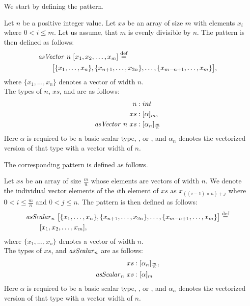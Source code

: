 We start by defining the \asVector pattern.
\begin{definition}
  \label{definition:pattern:asVector}
  Let $n$ be a positive integer value.
  Let $xs$ be an array of size $m$ with elements $x_i$ where $0 < i \leq m$.
  Let us assume, that $m$ is evenly divisible by $n$.
  The \asVector pattern is then defined as follows:
  \begin{align*}
    &\text{\textit{asVector}}\ n\ [x_1, x_2, \dots, x_m] \stackrel{\textrm{\scriptsize def}}{=} \\
    &\qquad\big[\{x_1, \ldots, x_n\}, \{x_{n+1}, \ldots, x_{2n}\}, \ldots, \{x_{m-n+1}, \ldots, x_m\}\big],
  \end{align*}
  where $\{x_1,\ldots,x_n\}$ denotes a vector of width $n$.\\
  The types of $n$, $xs$, and \asVector are as follows:
  \begin{align*}
    n &: int\\
    xs &: [\alpha]_m,\\
    \text{\textit{asVector}}\ n\ xs &: [\alpha_n]_{\frac{m}{n}}
  \end{align*}
  Here $\alpha$ is required to be a basic scalar type, \eg,  or , and $\alpha_n$ denotes the vectorized version of that type with a vector width of $n$.
\end{definition}

\noindent
The corresponding \asScalar pattern is defined as follows.
\begin{definition}
  \label{definition:pattern:asScalar}
  Let $xs$ be an array of size $\frac{m}{n}$ whose elements are vectors of width $n$.
  We denote the individual vector elements of the $i$th element of $xs$ as $x_{((i-1)\times n)+j}$ where $0 < i \leq \frac{m}{n}$ and $0 < j \leq n$.
  The \asScalar pattern is then defined as follows:
  \begin{align*}
    &\text{\textit{asScalar}}_n\ \big[\{x_1, \ldots, x_n\}, \{x_{n+1}, \ldots, x_{2n}\}, \ldots, \{x_{m-n+1}, \ldots, x_m\}\big] \stackrel{\textrm{\scriptsize def}}{=}\\
    &\qquad [x_1, x_2, \dots, x_m],
  \end{align*}
  where $\{x_1,\ldots,x_n\}$ denotes a vector of width $n$.\\
  The types of $xs$, and $\text{\textit{asScalar}}_n$ are as follows:
  \begin{align*}
    xs &: [\alpha_n]_{\frac{m}{n}},\\
    \text{\textit{asScalar}}_n\ xs &: [\alpha]_m
  \end{align*}
  Here $\alpha$ is required to be a basic scalar type, \eg,  or , and $\alpha_n$ denotes the vectorized version of that type with a vector width of $n$.
\end{definition}

